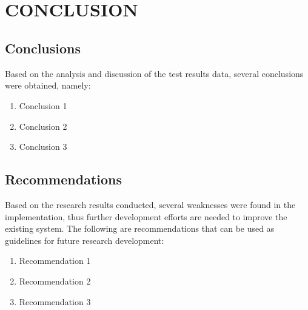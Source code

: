 \chapter[CONCLUSION]{\\CONCLUSION}

\section{Conclusions}
Based on the analysis and discussion of the test results data, several conclusions were obtained, namely:
\begin{enumerate}
    \item Conclusion 1
    \item Conclusion 2
    \item Conclusion 3
\end{enumerate}

\section{Recommendations}
Based on the research results conducted, several weaknesses were found in the implementation, thus further development efforts are needed to improve the existing system. The following are recommendations that can be used as guidelines for future research development:
\begin{enumerate}
    \item Recommendation 1
    \item Recommendation 2
    \item Recommendation 3
\end{enumerate}

